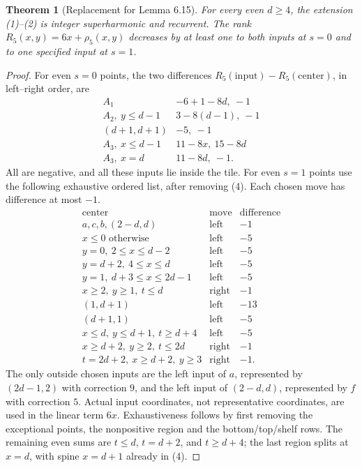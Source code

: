 \documentclass[11pt]{article}
\newtheorem{theorem}{Theorem}
\begin{document}
\begin{theorem}[Replacement for Lemma 6.15]
For every even $d\ge4$, the extension (1)--(2) is integer superharmonic
and recurrent. The rank $R_5(x,y)=6x+\rho_5(x,y)$ decreases by at least
one to both inputs at $s=0$ and to one specified input at $s=1$.
\end{theorem}
\begin{proof}
For even $s=0$ points, the two differences
$R_5(\text{input})-R_5(\text{center})$, in left--right order, are
\[
\begin{array}{c|c}
A_1&-6+1-8d,\ -1\\
A_2,\ y\le d-1&3-8(d-1),\ -1\\
(d+1,d+1)&-5,\ -1\\
A_3,\ x\le d-1&11-8x,\ 15-8d\\
A_3,\ x=d&11-8d,\ -1.
\end{array}                                                    \tag{6}
\]
All are negative, and all these inputs lie inside the tile.
For even $s=1$ points use the following exhaustive ordered list, after
removing (4). Each chosen move has difference at most $-1$.
\[
\begin{array}{l|c|c}
\text{center}&\text{move}&\text{difference}\\\hline
 a,c,b,(2-d,d)&\text{left}&-1\\
 x\le0\text{ otherwise}&\text{left}&-5\\
 y=0,\ 2\le x\le d-2&\text{left}&-5\\
 y=d+2,\ 4\le x\le d&\text{left}&-5\\
 y=1,\ d+3\le x\le2d-1&\text{left}&-5\\
 x\ge2,\ y\ge1,\ t\le d&\text{right}&-1\\
 (1,d+1)&\text{left}&-13\\
 (d+1,1)&\text{left}&-5\\
 x\le d,\ y\le d+1,\ t\ge d+4&\text{left}&-5\\
 x\ge d+2,\ y\ge2,\ t\le2d&\text{right}&-1\\
 t=2d+2,\ x\ge d+2,\ y\ge3&\text{right}&-1.
\end{array}                                                    \tag{7}
\]
The only outside chosen inputs are the left input of $a$, represented
by $(2d-1,2)$ with correction $9$, and the left input of $(2-d,d)$,
represented by $f$ with correction $5$. Actual input coordinates,
not representative coordinates, are used in the linear term $6x$.
Exhaustiveness follows by first removing the exceptional points, the
nonpositive region and the bottom/top/shelf rows. The remaining even
sums are $t\le d$, $t=d+2$, and $t\ge d+4$; the last region splits at
$x=d$, with spine $x=d+1$ already in (4).


\end{proof}
\end{document}
